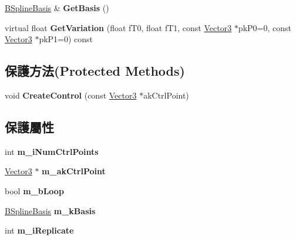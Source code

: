 \begin{DoxyCompactItemize}
\item 
\hyperlink{class_magnum_1_1_b_spline_basis}{B\+Spline\+Basis} \& {\bfseries Get\+Basis} ()\hypertarget{class_magnum_1_1_b_spline_curve3_add2963dc4d3403addfd169a47fd017b6}{}\label{class_magnum_1_1_b_spline_curve3_add2963dc4d3403addfd169a47fd017b6}

\item 
virtual float {\bfseries Get\+Variation} (float f\+T0, float f\+T1, const \hyperlink{class_magnum_1_1_vector3}{Vector3} $\ast$pk\+P0=0, const \hyperlink{class_magnum_1_1_vector3}{Vector3} $\ast$pk\+P1=0) const \hypertarget{class_magnum_1_1_b_spline_curve3_a7bcbc3885c298a90fe6bf3093f9aac5b}{}\label{class_magnum_1_1_b_spline_curve3_a7bcbc3885c298a90fe6bf3093f9aac5b}

\end{DoxyCompactItemize}
\subsection*{保護方法(Protected Methods)}
\begin{DoxyCompactItemize}
\item 
void {\bfseries Create\+Control} (const \hyperlink{class_magnum_1_1_vector3}{Vector3} $\ast$ak\+Ctrl\+Point)\hypertarget{class_magnum_1_1_b_spline_curve3_a38bfa99544d150de591b32bee5b99c19}{}\label{class_magnum_1_1_b_spline_curve3_a38bfa99544d150de591b32bee5b99c19}

\end{DoxyCompactItemize}
\subsection*{保護屬性}
\begin{DoxyCompactItemize}
\item 
int {\bfseries m\+\_\+i\+Num\+Ctrl\+Points}\hypertarget{class_magnum_1_1_b_spline_curve3_a5ad80ce62e37342f440d00952a3e9fe1}{}\label{class_magnum_1_1_b_spline_curve3_a5ad80ce62e37342f440d00952a3e9fe1}

\item 
\hyperlink{class_magnum_1_1_vector3}{Vector3} $\ast$ {\bfseries m\+\_\+ak\+Ctrl\+Point}\hypertarget{class_magnum_1_1_b_spline_curve3_aeab57dd9c9dca7a4027afba72d266379}{}\label{class_magnum_1_1_b_spline_curve3_aeab57dd9c9dca7a4027afba72d266379}

\item 
bool {\bfseries m\+\_\+b\+Loop}\hypertarget{class_magnum_1_1_b_spline_curve3_aa9e986825a98f21d0e49e69a62ac3552}{}\label{class_magnum_1_1_b_spline_curve3_aa9e986825a98f21d0e49e69a62ac3552}

\item 
\hyperlink{class_magnum_1_1_b_spline_basis}{B\+Spline\+Basis} {\bfseries m\+\_\+k\+Basis}\hypertarget{class_magnum_1_1_b_spline_curve3_a4bf0f0278907f1229f6838c40fd8c9a8}{}\label{class_magnum_1_1_b_spline_curve3_a4bf0f0278907f1229f6838c40fd8c9a8}

\item 
int {\bfseries m\+\_\+i\+Replicate}\hypertarget{class_magnum_1_1_b_spline_curve3_a05bfa375e56b8f9aef7ea5e9dd5683aa}{}\label{class_magnum_1_1_b_spline_curve3_a05bfa375e56b8f9aef7ea5e9dd5683aa}

\end{DoxyCompactItemize}
